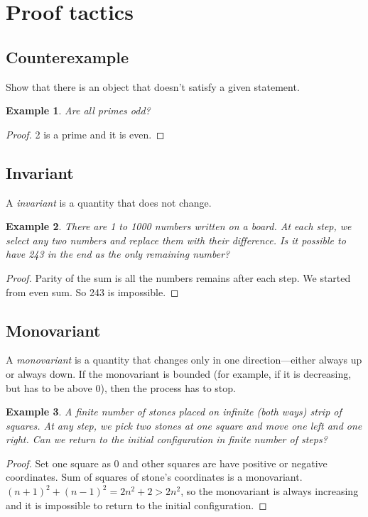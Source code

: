 \documentclass[11pt]{article}
\newtheorem{theorem}{Example}
\begin{document}
\section{Proof tactics}

\subsection{Counterexample}

Show that there is an object that doesn't satisfy a given statement.

\begin{theorem}
  Are all primes odd?
\end{theorem}
\begin{proof}
  2 is a prime and it is even.
\end{proof}

\subsection{Invariant}

A \emph{invariant} is a quantity that does not change.

\begin{theorem}
  There are 1 to 1000 numbers written on a board. At each step, we select any two numbers and replace them with their difference. Is it possible to have 243 in the end as the only remaining number?
\end{theorem}
\begin{proof}
  Parity of the sum is all the numbers remains after each step. We started from even sum. So 243 is impossible.
\end{proof}

\subsection{Monovariant}

A \emph{monovariant} is a quantity that changes only in one direction---either always up or always down.
If the monovariant is bounded (for example, if it is decreasing, but has to be above 0), then the process has to stop.

\begin{theorem}
  A finite number of stones placed on infinite (both ways) strip of squares. At any step, we pick two stones at one square and move one left and one right. Can we return to the initial configuration in finite number of steps?
\end{theorem}
\begin{proof}
  Set one square as 0 and other squares are have positive or negative coordinates.
  Sum of squares of stone's coordinates is a monovariant.
  $(n + 1)^2 + (n - 1)^2 = 2n^2 + 2 > 2n^2$,
  so the monovariant is always increasing and it is impossible to return to the initial configuration.
\end{proof}
\end{document}
